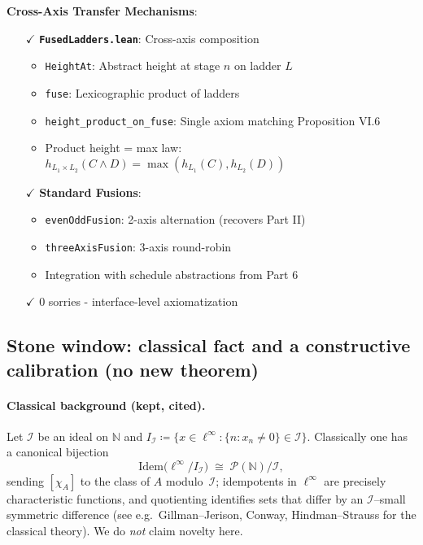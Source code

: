 \documentclass[11pt]{article}
\theoremstyle{definition}
\theoremstyle{remark}
\begin{document}
\textbf{Cross-Axis Transfer Mechanisms}:
\begin{itemize}
\item[$\checkmark$] \textbf{\texttt{FusedLadders.lean}}: Cross-axis composition
  \begin{itemize}
  \item \texttt{HeightAt}: Abstract height at stage $n$ on ladder $L$
  \item \texttt{fuse}: Lexicographic product of ladders
  \item \texttt{height\_product\_on\_fuse}: Single axiom matching Proposition VI.6
  \item Product height = max law: $h_{L_1 \times L_2}(C \land D) = \max(h_{L_1}(C), h_{L_2}(D))$
  \end{itemize}
\item[$\checkmark$] \textbf{Standard Fusions}:
  \begin{itemize}
  \item \texttt{evenOddFusion}: 2-axis alternation (recovers Part II)
  \item \texttt{threeAxisFusion}: 3-axis round-robin
  \item Integration with schedule abstractions from Part 6
  \end{itemize}
\item[$\checkmark$] 0 sorries - interface-level axiomatization
\end{itemize}

\subsection{Stone window: classical fact and a constructive calibration (no new theorem)}
\label{subsec:stone-window}

\paragraph{Classical background (kept, cited).}
Let $\mathcal I$ be an ideal on $\mathbb N$ and
$I_{\mathcal I} \coloneqq \{x\in \ell^\infty : \{n : x_n\neq 0\}\in \mathcal I\}$.
Classically one has a canonical bijection
\[
  \mathrm{Idem}\bigl(\ell^\infty / I_{\mathcal I}\bigr)
  \;\cong\;
  \mathcal P(\mathbb N)/\mathcal I,
\]
sending $[\chi_A]$ to the class of $A$ modulo~$\mathcal I$; idempotents in $\ell^\infty$ are precisely characteristic functions, and quotienting identifies sets that differ by an $\mathcal I$--small symmetric difference
(see e.g.\ Gillman--Jerison, Conway, Hindman--Strauss for the classical theory). We do \emph{not} claim novelty here.
\end{document}
